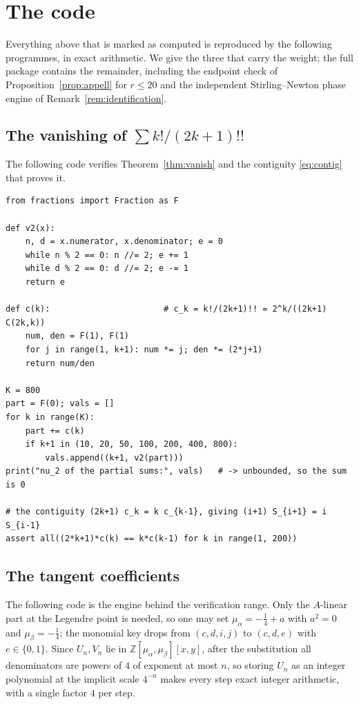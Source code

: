 \documentclass[12pt]{amsart}
\theoremstyle{definition}
\theoremstyle{remark}
\newcommand{\ma}{\mu_\alpha}
\newcommand{\mb}{\mu_\beta}
\begin{document}
\section{The code}\label{sec:code}

Everything above that is marked as computed is reproduced by the following programmes, in exact arithmetic.  We give the three that carry the weight; the full package contains the remainder, including the endpoint check of Proposition~\ref{prop:appell} for $r\le20$ and the independent Stirling--Newton phase engine of Remark~\ref{rem:identification}.

\subsection{The vanishing of \texorpdfstring{$\sum k!/(2k+1)!!$}{the factorial series}}

The following code verifies Theorem~\ref{thm:vanish} and the contiguity \eqref{eq:contig} that proves it.

{\small
\begin{verbatim}
from fractions import Fraction as F

def v2(x):
    n, d = x.numerator, x.denominator; e = 0
    while n % 2 == 0: n //= 2; e += 1
    while d % 2 == 0: d //= 2; e -= 1
    return e

def c(k):                       # c_k = k!/(2k+1)!! = 2^k/((2k+1) C(2k,k))
    num, den = F(1), F(1)
    for j in range(1, k+1): num *= j; den *= (2*j+1)
    return num/den

K = 800
part = F(0); vals = []
for k in range(K):
    part += c(k)
    if k+1 in (10, 20, 50, 100, 200, 400, 800):
        vals.append((k+1, v2(part)))
print("nu_2 of the partial sums:", vals)   # -> unbounded, so the sum is 0

# the contiguity (2k+1) c_k = k c_{k-1}, giving (i+1) S_{i+1} = i S_{i-1}
assert all((2*k+1)*c(k) == k*c(k-1) for k in range(1, 200))
\end{verbatim}
}

\subsection{The tangent coefficients}

The following code is the engine behind the verification range.  Only the $A$-linear part at the Legendre point is needed, so one may set $\ma=-\frac14+a$ with $a^2=0$ and $\mb=-\frac14$; the monomial key drops from $(c,d,i,j)$ to $(c,d,e)$ with $e\in\{0,1\}$.  Since $U_n,V_n$ lie in $\mathbb Z[\ma,\mb][x,y]$, after the substitution all denominators are powers of $4$ of exponent at most $n$, so storing $U_n$ as an integer polynomial at the implicit scale $4^{-n}$ makes every step exact integer arithmetic, with a single factor $4$ per step.
\end{document}
